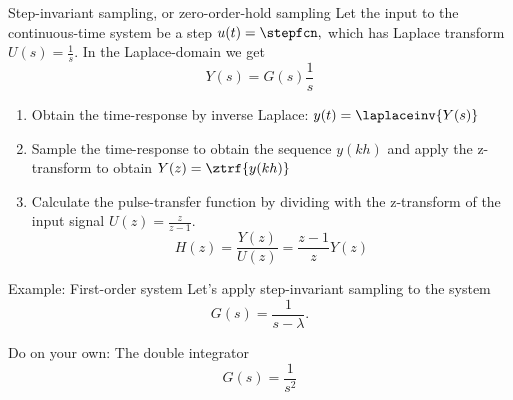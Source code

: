 \documentclass[presentation,aspectratio=169]{beamer}
\begin{document}
\begin{frame}[label=sec-3-2]{Step-invariant sampling, or zero-order-hold sampling}
Let the input to the continuous-time system be a step \(u(t)=\stepfcn,\) which has Laplace transform \(U(s)=\frac{1}{s}.\) In the Laplace-domain we get
\[Y(s) = G(s)\frac{1}{s}\]
\begin{enumerate}
\item Obtain the time-response by inverse Laplace: \(y(t)=\laplaceinv{Y(s)}\)
\item Sample the time-response to obtain the sequence \(y(kh)\) and apply  the z-transform to obtain \(Y(z) = \ztrf{y(kh)}\)
\item Calculate the pulse-transfer function by dividing with the z-transform of the input signal \(U(z) = \frac{z}{z-1}. \) \[H(z) = \frac{Y(z)}{U(z)} = \frac{z-1}{z}Y(z) \]
\end{enumerate}
\end{frame}

\begin{frame}[label=sec-3-3]{Example: First-order system}
Let's apply step-invariant sampling to the system
\[ G(s) = \frac{1}{s - \lambda}. \]
\end{frame}

\begin{frame}[label=sec-3-4]{Do on your own: The double integrator}
\[ G(s) = \frac{1}{s^2} \]
\end{frame}
\end{document}
